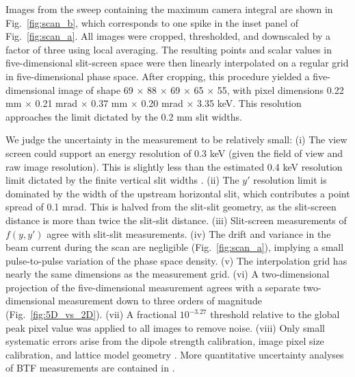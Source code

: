 \documentclass[%
 reprint,
nofootinbib,
 amsmath,amssymb,
 aps,
prstab,
]{revtex4-2}
\begin{document}
Images from the sweep containing the maximum camera integral are shown in Fig.~\ref{fig:scan_b}, which corresponds to one spike in the inset panel of Fig.~\ref{fig:scan_a}. All images were cropped, thresholded, and downscaled by a factor of three using local averaging. The resulting points and scalar values in five-dimensional slit-screen space were then linearly interpolated on a regular grid in five-dimensional phase space. After cropping, this procedure yielded a five-dimensional image of shape 69 $\times$ 88 $\times$ 69 $\times$ 65 $\times$ 55, with pixel dimensions 0.22 mm $\times$ 0.21 mrad $\times$ 0.37 mm $\times$ 0.20 mrad $\times$ 3.35 keV. This resolution approaches the limit dictated by the 0.2 mm slit widths.

We judge the uncertainty in the measurement to be relatively small: (i) The view screen could support an energy resolution of 0.3 keV (given the field of view and raw image resolution). This is slightly less than the estimated 0.4 keV resolution limit dictated by the finite vertical slit widths \cite{Ruisard2020}. (ii) The $y'$ resolution limit is dominated by the width of the upstream horizontal slit, which contributes a point spread of 0.1 mrad. This is halved from the slit-slit geometry, as the slit-screen distance is more than twice the slit-slit distance. (iii) Slit-screen measurements of $f(y, y')$ agree with slit-slit measurements. (iv) The drift and variance in the beam current during the scan are negligible (Fig.~\ref{fig:scan_a}), implying a small pulse-to-pulse variation of the phase space density. (v) The interpolation grid has nearly the same dimensions as the measurement grid. (vi) A two-dimensional projection of the five-dimensional measurement agrees with a separate two-dimensional measurement down to three orders of magnitude (Fig.~\ref{fig:5D_vs_2D}). (vii) A fractional $10^{-3.27}$ threshold relative to the global peak pixel value was applied to all images to remove noise. (viii) Only small systematic errors arise from the dipole strength calibration, image pixel size calibration, and lattice model geometry \cite{Ruisard2020}. More quantitative uncertainty analyses of BTF measurements are contained in \cite{Cathey2018-thesis, Ruisard2020}.
%
\end{document}
